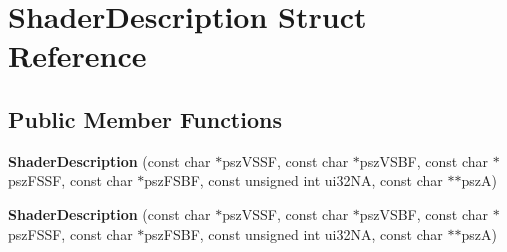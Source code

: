 \hypertarget{struct_shader_description}{\section{Shader\+Description Struct Reference}
\label{struct_shader_description}
}
\subsection*{Public Member Functions}
\begin{DoxyCompactItemize}
\item 
\hypertarget{struct_shader_description_a9afd1c744d4445f99c49aae7b5ce8afe}{{\bfseries Shader\+Description} (const char $\ast$psz\+V\+S\+S\+F, const char $\ast$psz\+V\+S\+B\+F, const char $\ast$psz\+F\+S\+S\+F, const char $\ast$psz\+F\+S\+B\+F, const unsigned int ui32\+N\+A, const char $\ast$$\ast$psz\+A)}\label{struct_shader_description_a9afd1c744d4445f99c49aae7b5ce8afe}

\item 
\hypertarget{struct_shader_description_a9afd1c744d4445f99c49aae7b5ce8afe}{{\bfseries Shader\+Description} (const char $\ast$psz\+V\+S\+S\+F, const char $\ast$psz\+V\+S\+B\+F, const char $\ast$psz\+F\+S\+S\+F, const char $\ast$psz\+F\+S\+B\+F, const unsigned int ui32\+N\+A, const char $\ast$$\ast$psz\+A)}\label{struct_shader_description_a9afd1c744d4445f99c49aae7b5ce8afe}

\end{DoxyCompactItemize}

